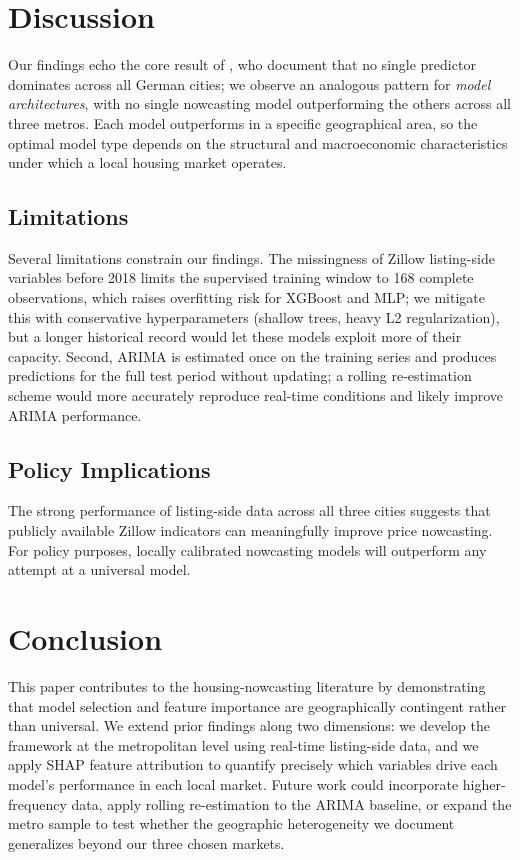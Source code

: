\documentclass[12pt]{article}
\begin{document}
\section{Discussion}

Our findings echo the core result of \citet{kholodilin2014business}, who document that no single predictor dominates across all German cities; we observe an analogous pattern for \emph{model architectures}, with no single nowcasting model outperforming the others across all three metros. Each model outperforms in a specific geographical area, so the optimal model type depends on the structural and macroeconomic characteristics under which a local housing market operates.

\subsection{Limitations}
Several limitations constrain our findings. The missingness of Zillow listing-side variables before 2018 limits the supervised training window to 168 complete observations, which raises overfitting risk for XGBoost and MLP; we mitigate this with conservative hyperparameters (shallow trees, heavy L2 regularization), but a longer historical record would let these models exploit more of their capacity. Second, ARIMA is estimated once on the training series and produces predictions for the full test period without updating; a rolling re-estimation scheme would more accurately reproduce real-time conditions and likely improve ARIMA performance.

\subsection{Policy Implications}
The strong performance of listing-side data across all three cities suggests that publicly available Zillow indicators can meaningfully improve price nowcasting. For policy purposes, locally calibrated nowcasting models will outperform any attempt at a universal model.

\section{Conclusion}
This paper contributes to the housing-nowcasting literature by demonstrating that model selection and feature importance are geographically contingent rather than universal. We extend prior findings along two dimensions: we develop the framework at the metropolitan level using real-time listing-side data, and we apply SHAP feature attribution to quantify precisely which variables drive each model's performance in each local market. Future work could incorporate higher-frequency data, apply rolling re-estimation to the ARIMA baseline, or expand the metro sample to test whether the geographic heterogeneity we document generalizes beyond our three chosen markets.
\end{document}

